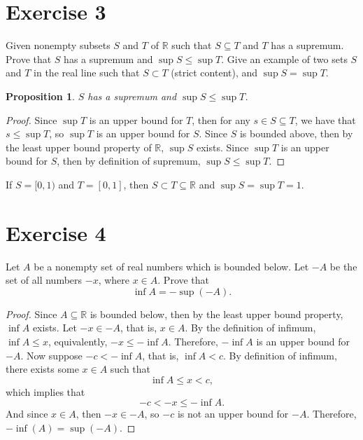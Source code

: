 \documentclass[12pt]{article}
\newtheorem{proposition}{Proposition}
\newenvironment{problem}
    {\begin{lrbox}{\mybox}\begin{minipage}{\textwidth-10pt}}
    {\end{minipage}\end{lrbox}\framebox[6.5in]{\usebox{\mybox}}}
\newcommand{\R}{\mathbb{R}}
\begin{document}
\section*{Exercise 3}
\begin{problem}
    Given nonempty subsets $S$ and $T$ of $\mathbb{R}$ such that $S \subseteq T$ and $T$ has a supremum. Prove that $S$ has a supremum and $\sup S \le \sup T$. Give an example of two sets $S$ and $T$ in the real line such that $S \subset T$ (strict content), and $\sup S = \sup T$. 
\end{problem}

\begin{proposition}
    $S$ has a supremum and $\sup S \le \sup T$.
\end{proposition}

\begin{proof}
    Since $\sup T$ is an upper bound for $T$, then for any $s\in S\subseteq T$, we have that $s\leq \sup T$, so $\sup T$ is an upper bound for $S$. Since $S$ is bounded above, then by the least upper bound property of $\R$, $\sup S$ exists. Since $\sup T$ is an upper bound for $S$, then by definition of supremum, $\sup S \leq \sup T$.
    
\end{proof}

If $S=[0,1)$ and $T=[0,1]$, then $S\subset T\subseteq\R$ and $\sup S = \sup T=1$.


\section*{Exercise 4}
\begin{problem}
    Let $A$ be a nonempty set of real numbers which is bounded below. Let $-A$ be the set of all numbers $-x$, where $x\in A$. Prove that 
    \[
     \inf A = - \sup (-A).
    \]
\end{problem}

\begin{proof}
    Since $A\subseteq \R$ is bounded below, then by the least upper bound property, $\inf A$ exists. Let $-x\in-A$, that is, $x\in A$. By the definition of infimum, $\inf A \leq x$, equivalently, $-x\leq -\inf A$. Therefore, $-\inf A$ is an upper bound for $-A$. Now suppose $-c< -\inf A$, that is, $\inf A < c$. By definition of infimum, there exists some $x\in A$ such that
    \[\inf A \leq x < c,\]
    which implies that
    \[-c < -x \leq -\inf A.\]
    And since $x\in A$, then $-x\in-A$, so $-c$ is not an upper bound for $-A$. Therefore, $-\inf(A) = \sup(-A)$.
    
\end{proof}
\end{document}

